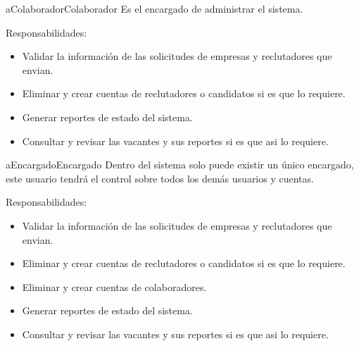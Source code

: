  \begin{actor}{aColaborador}{Colaborador}{%
    Es el encargado de administrar el sistema.}
    \item[Responsabilidades:] \hfill
    \begin{itemize}
        \item Validar la información de las solicitudes de empresas y reclutadores que envian.
        \item Eliminar y crear cuentas de reclutadores o candidatos si es que lo requiere.
        \item Generar reportes de estado del sistema.
        \item Consultar y revisar las vacantes y sus reportes si es que asi lo requiere.
    \end{itemize}

\end{actor}

\begin{actor}{aEncargado}{Encargado}{%
    Dentro del sistema solo puede existir un único encargado, este usuario tendrá el control sobre todos los demás usuarios y cuentas.
   }   
   \item[Responsabilidades:] \hfill
    \begin{itemize}
        \item Validar la información de las solicitudes de empresas y reclutadores que envian.
        \item Eliminar y crear cuentas de reclutadores o candidatos si es que lo requiere.
        \item Eliminar y crear cuentas de colaboradores.
        \item Generar reportes de estado del sistema.
        \item Consultar y revisar las vacantes y sus reportes si es que asi lo requiere.
    \end{itemize}

\end{actor}
